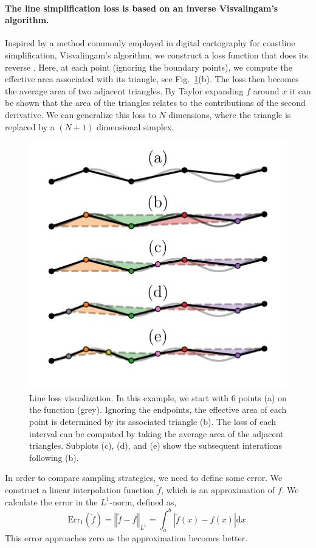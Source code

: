 \documentclass[english, twocolumn, 10pt, aps, superscriptaddress, floatfix, prb, citeautoscript]{revtex4-1}
\renewcommand{\citep}{\cite}
\begin{document}
\paragraph{The line simplification loss is based on an inverse Visvalingam's algorithm.}

Inspired by a method commonly employed in digital cartography for coastline simplification, Visvalingam's algorithm, we construct a loss function that does its reverse \citep{Visvalingam1990}.
Here, at each point (ignoring the boundary points), we compute the effective area associated with its triangle, see Fig.~\ref{fig:line_loss}(b).
The loss then becomes the average area of two adjacent triangles.
By Taylor expanding \(f\) around \(x\) it can be shown that the area of the triangles relates to the contributions of the second derivative.
We can generalize this loss to \(N\) dimensions, where the triangle is replaced by a \((N+1)\) dimensional simplex.

\begin{figure}
\centering
\includegraphics{figures/line_loss.pdf}
\caption{Line loss visualization.
In this example, we start with 6 points (a) on the function (grey).
Ignoring the endpoints, the effective area of each point is determined by its associated triangle (b).
The loss of each interval can be computed by taking the average area of the adjacent triangles.
Subplots (c), (d), and (e) show the subsequent interations following (b).\label{fig:line_loss}}
\end{figure}

In order to compare sampling strategies, we need to define some error.
We construct a linear interpolation function \(\tilde{f}\), which is an approximation of \(f\).
We calculate the error in the \(L^{1}\)-norm, defined as,
\[
\text{Err}_{1}(\tilde{f})=\left\Vert \tilde{f}-f\right\Vert _{L^{1}}=\int_{a}^{b}\left|\tilde{f}(x)-f(x)\right|\text{d}x.
\]
This error approaches zero as the approximation becomes better.
\end{document}
